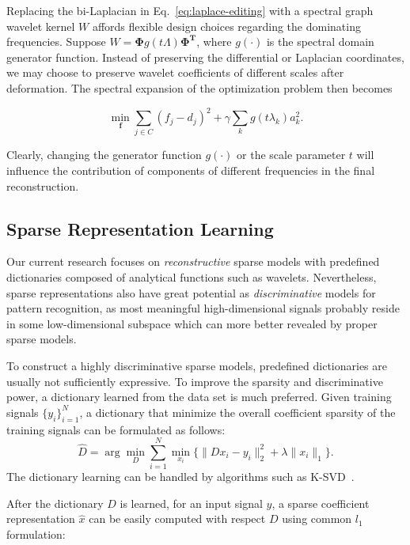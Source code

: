 Replacing the bi-Laplacian in Eq.~\ref{eq:laplace-editing} with a spectral graph wavelet kernel
$W$ affords flexible design choices regarding the dominating frequencies. Suppose
$W=\mathbf{\Phi}g(t\Lambda)\mathbf{\Phi^T}$, where $g(\cdot)$ is the spectral domain generator
function. Instead of preserving the differential or Laplacian coordinates, we may choose
to preserve wavelet coefficients of different scales after deformation. The spectral expansion
of the optimization problem then becomes

\begin{equation}
\label{eq:sgw-editing}
\min_\mathbf{f} \sum_{j\in C} (f_j - d_j)^2 + \gamma \sum_k g(t\lambda_k) a_k^2.
\end{equation}

Clearly, changing the generator function $g(\cdot)$ or the scale parameter $t$ will
influence the contribution of components of different frequencies in the final reconstruction.

\subsection*{Sparse Representation Learning}
Our current research focuses on \emph{reconstructive} sparse models with predefined dictionaries
composed of analytical functions such as wavelets. Nevertheless, sparse representations also have
great potential as \emph{discriminative} models for pattern recognition, as most meaningful 
high-dimensional signals probably reside in some low-dimensional subspace which can more better revealed
by proper sparse models.

To construct a highly discriminative sparse models, predefined dictionaries are usually not
sufficiently expressive. To improve the sparsity and discriminative power, a dictionary learned from
the data set is much preferred. Given training signals $\{y_i\}_{i=1}^N$, a dictionary that
minimize the overall coefficient sparsity of the training signals can be formulated as follows:
\begin{equation}
\label{eq:dictionary-learning}
\hat{D}=\arg\min_D\sum_{i=1}^N \min_{x_i}\{\|Dx_i - y_i\|_2^2 + \lambda\|x_i\|_1\}.
\end{equation}
The dictionary learning can be handled by algorithms such as K-SVD~\cite{Aharon2006}.

After the dictionary $D$ is learned, for an input signal $y$, a sparse coefficient
representation $\hat{x}$ can be easily computed with respect $D$ using
common $l_1$ formulation:

